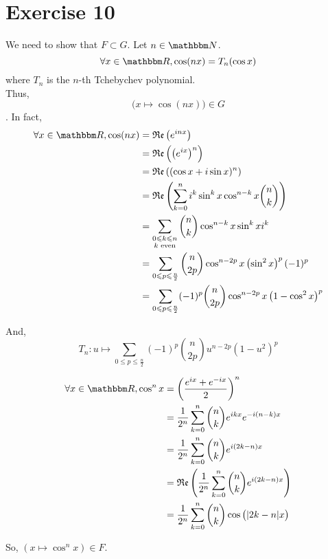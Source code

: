 \part{Exercise 10}

We need to show that $F \subset G$. Let $n \in \N$. \[
	\forall x \in \R, \cos(nx) = T_n(\cos x)
\] where $T_n$ is the $n$-th Tchebychev polynomial.\\
Thus, \[
	\big(x \mapsto \cos(nx)\big) \in G
\]. In fact,
\begin{align*}
	\forall x \in \R, \cos(nx) &= \Re\left(e^{inx}\right)\\
	&= \Re\left( \left(e^{ix}\right)^n \right)  \\
	&= \Re\left( (\cos x + i \sin x)^n \right)  \\
	&= \Re\left( \sum_{k=0}^{n} i^k \sin^k x \cos^{n-k}x {n \choose k} \right)\\
	&= \sum_{\substack{0 \le k \le n\\ k \text{ even}}} {n \choose k} \cos^{n-k} x  \sin ^{k} x i^k\\
	&= \sum_{0 \le p \le \frac{n}{2}} {n \choose 2p} \cos^{n-2p}x \left(\sin^2 x\right)^p (-1)^p\\
	&= \sum_{0 \le p \le \frac{n}{2}} (-1)^p {n \choose 2p} \cos^{n-2p} x \left( 1 - \cos^2x \right) ^p \\
\end{align*}

And, \[
	T_n: u \mapsto \sum_{0 \le p \le \frac{n}{2}} (-1)^p {n \choose 2p} u^{n-2p} \left( 1-u^2 \right) ^p
\]

\begin{align*}
	\forall x \in \R, \cos^n x &= \left( \frac{e^{ix} + e^{-ix}}{2} \right)^n \\
	&= \frac{1}{2^n} \sum_{k=0}^n {n \choose k} e^{ikx} e^{-i(n-k)x}\\
	&= \frac{1}{2^n} \sum_{k=0}^n {n\choose k} e^{i(2k-n)x} \\
	&= \Re\left( \frac{1}{2^n} \sum_{k=0}^n {n\choose k} e^{i(2k-n)x} \right)  \\
	&= \frac{1}{2^n}\sum_{k=0}^n {n\choose k} \cos\big( | 2k-n| x \big)\\
\end{align*}

So, $\left( x \mapsto \cos^n x \right) \in F$.
